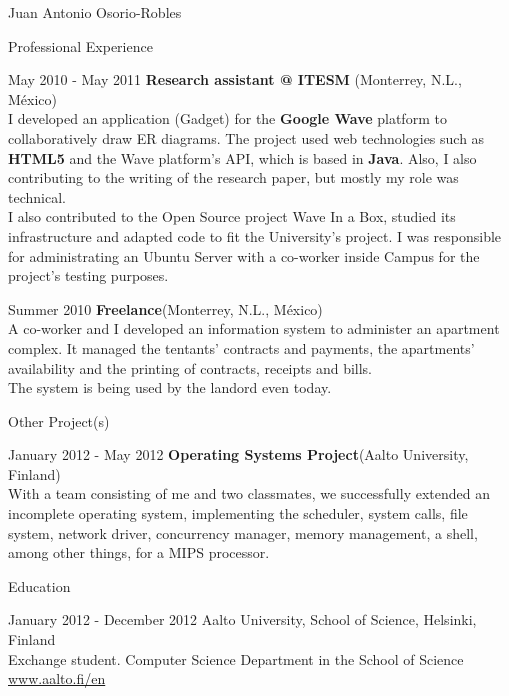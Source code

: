 \documentclass[spanish,10pt,letterpaper]{article}
\begin{document}
\begin{cv}{Juan Antonio Osorio-Robles}
\begin{cvlist}{Professional Experience}
		\item [May 2010 - May 2011]
            \textbf{Research assistant @ ITESM} (Monterrey, N.L., M\'{e}xico)\\
            I developed an application (Gadget) for the \textbf{Google Wave}
            platform to collaboratively draw ER diagrams. The project used web
            technologies such as \textbf{HTML5} and the Wave platform's API,
            which is based in \textbf{Java}. Also, I also contributing to the
            writing of the research paper, but mostly my role was technical.\\

            I also contributed to the Open Source project Wave In a Box,
            studied its infrastructure and adapted code to fit the
            University's project. I was responsible for administrating an
            Ubuntu Server with a co-worker inside Campus for the project's
            testing purposes.

		\item [Summer 2010]
            \textbf{Freelance}(Monterrey, N.L., M\'{e}xico)\\
			A co-worker and I developed an information system to administer an
            apartment complex. It managed the tentants' contracts and payments,
            the apartments' availability and the printing of contracts,
            receipts and bills.\\

            The system is being used by the landord even today.

	\end{cvlist}

    \begin{cvlist}{Other Project(s)}
		\item [January 2012 - May 2012]
            \textbf{Operating Systems Project}(Aalto University, Finland)\\
            With a team consisting of me and two classmates, we successfully
            extended an incomplete operating system, implementing the scheduler,
            system calls, file system, network driver, concurrency manager,
            memory management, a shell, among other things, for a MIPS
            processor.
	\end{cvlist}

	\begin{cvlist}{Education}
		\item [January 2012 - December 2012]
			Aalto University, School of Science, Helsinki, Finland\\
			Exchange student. Computer Science Department in the School of
            Science\\
			\href{www.aalto.fi/en}{www.aalto.fi/en}


\end{cvlist}
\end{cv}
\end{document}
